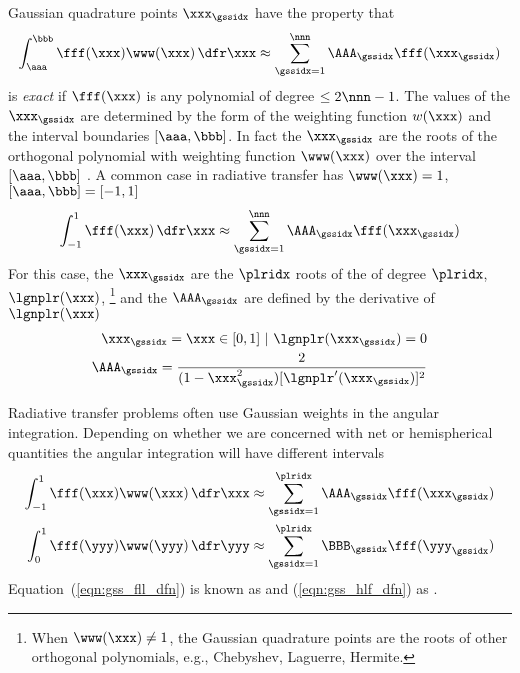 \documentclass[12pt]{article}
\begin{document}
Gaussian quadrature points $\xxx_{\gssidx}$ have the property that
\begin{equation}
\int_{\aaa}^{\bbb} \fff(\xxx) \www(\xxx) \,\dfr\xxx \approx
\sum_{\gssidx = 1}^{\nnn} \AAA_{\gssidx} \fff(\xxx_{\gssidx})  
\label{eqn:gss_gnr_dfn}
\end{equation}
is \textit{exact} if $\fff(\xxx)$ is any polynomial of degree 
$\le 2\nnn - 1$. 
The values of the $\xxx_{\gssidx}$ are determined by the form of the weighting
function $w(\xxx)$ and the interval boundaries $[\aaa,\bbb]$.
In fact the $\xxx_{\gssidx}$ are the roots of the orthogonal polynomial with
weighting function $\www(\xxx)$ over the interval $[\aaa,\bbb]$ \cite[see,
e.g.,][p. 969]{Arf85}. 
A common case in radiative transfer has 
$\www(\xxx) = 1$, $[\aaa,\bbb] = [-1,1]$  
\begin{equation}
\int_{-1}^{1} \fff(\xxx) \,\dfr\xxx \approx \sum_{\gssidx =
1}^{\nnn} \AAA_{\gssidx} \fff(\xxx_{\gssidx})  
\label{eqn:gss_dfn}
\end{equation}
For this case, the $\xxx_{\gssidx}$ are the $\plridx$ roots of the
 of degree $\plridx$, $\lgnplr(\xxx)$,  
\footnote{When $\www(\xxx) \ne 1$, the Gaussian quadrature points are
  the roots of other orthogonal polynomials, e.g., Chebyshev,
  Laguerre, Hermite.} and the  $\AAA_{\gssidx}$
are defined by the derivative of $\lgnplr(\xxx)$
\begin{eqnarray}
\xxx_{\gssidx} = \xxx \in [0,1]\ |\ \lgnplr(\xxx_{\gssidx}) = 0 \\
\AAA_{\gssidx} = \frac{2}{(1 - \xxx_{\gssidx}^{2})[\lgnplr^{\prime}(\xxx_{\gssidx})]^{2}}
\label{eqn:wgt_dfn}
\end{eqnarray}

Radiative transfer problems often use Gaussian weights in the angular
integration. 
Depending on whether we are concerned with net or hemispherical
quantities the angular integration will have different intervals
\begin{eqnarray}
\label{eqn:gss_fll_dfn}
\int_{-1}^{1} \fff(\xxx) \www(\xxx) \,\dfr\xxx \approx \sum_{\gssidx =
1}^{\plridx} \AAA_{\gssidx} \fff(\xxx_{\gssidx}) \\ 
\label{eqn:gss_hlf_dfn}
\int_{0}^{1} \fff(\yyy) \www(\yyy) \,\dfr\yyy \approx \sum_{\gssidx =
1}^{\plridx} \BBB_{\gssidx} \fff(\yyy_{\gssidx})  
\end{eqnarray}
Equation~(\ref{eqn:gss_fll_dfn}) is known as  and (\ref{eqn:gss_hlf_dfn}) as . 
\end{document}
